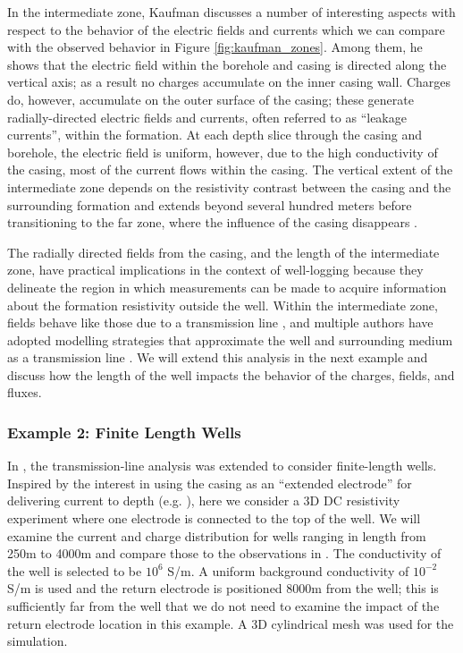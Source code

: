 In the intermediate zone, Kaufman discusses a number of interesting aspects with respect to  the behavior of the electric fields and currents which we can compare with the observed behavior in Figure \ref{fig:kaufman_zones}. Among them, he shows that the electric field within the borehole and casing is directed along the vertical axis; as a result no charges accumulate on the inner casing wall. Charges do, however, accumulate on the outer surface of the casing; these  generate radially-directed electric fields and currents, often referred to as “leakage currents”, within the formation. At each depth slice through the casing and borehole, the electric field is uniform, however, due to the high conductivity of the casing, most of the current flows within the casing.  The vertical extent of the intermediate zone depends on the resistivity contrast between the casing and the surrounding formation and extends beyond several hundred meters before transitioning to the far zone, where the influence of the casing disappears \citep{Kaufman1990}.





The radially directed fields from the casing, and the length of the intermediate zone, have practical implications in the context of well-logging because they delineate the region in which measurements can be made to acquire information about the formation resistivity outside the well. Within the intermediate zone, fields behave like those due to a transmission line \citep{Kaufman1990}, and multiple authors have adopted modelling strategies that approximate the well and surrounding medium as a transmission line \citep{Kong2009, Aldridge2015}. We will extend this analysis in the next example and discuss how the length of the well impacts the behavior of the charges, fields, and fluxes.
\subsubsection{Example 2: Finite Length Wells}
\label{sec:finite_length_well}

In \citep{Kaufman1993}, the transmission-line analysis was extended to consider finite-length wells. Inspired by the interest in using the casing as an ``extended electrode'' for delivering current to depth (e.g. \citep{Schenkel1994, Um2015, Weiss2016, hoversten2017borehole}), here we consider a 3D DC resistivity experiment where one electrode is connected to the top of the well. We will examine the current and charge distribution for wells ranging in length from 250m to 4000m and compare those to the observations in \citep{Kaufman1993}. The conductivity of the well is selected to be $10^6$ S/m. A uniform background conductivity of $10^{-2}$ S/m is used and the return electrode is positioned 8000m from the well; this is sufficiently far from the well that we do not need to examine the impact of the return electrode location in this example. A 3D cylindrical mesh was used for the simulation.

